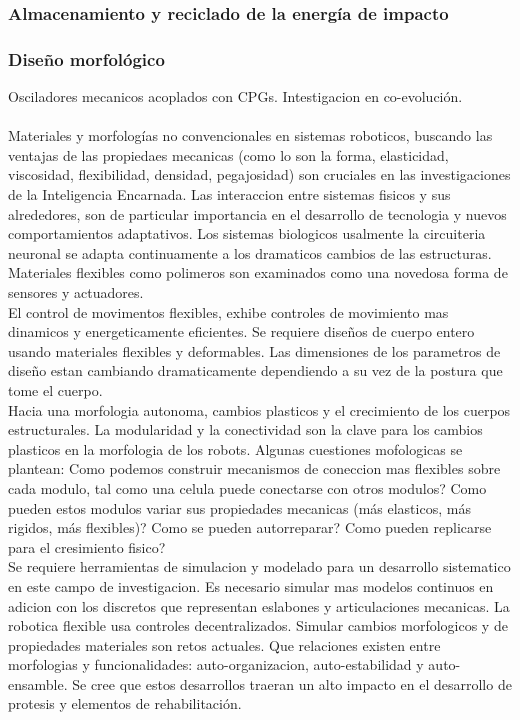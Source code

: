 \documentclass[10pt,onecolumn,twoside,letterpaper]{article}
\begin{document}
\subsubsection{Almacenamiento y reciclado de la energ\'ia de impacto}
\subsubsection{Dise\~no morfol\'ogico}
Osciladores mecanicos acoplados con CPGs. Intestigacion en co-evoluci\'on.\cite{Verdaasdonk2009}\\
\href{run:/home/jackmaster/Downloads/Doc Thesis/Walkers/[2009 B W Verdaasdonk and H F J M Koopman and F C T van der Helm] Art Energy efficient walking with central pattern generators: from passive dynamic walking to biologically inspired control.pdf}{
}\cite{Verdaasdonk2009}\\
Materiales y morfolog\'ias no convencionales en sistemas roboticos, buscando las ventajas de las propiedaes mecanicas (como lo son la forma, elasticidad, viscosidad, flexibilidad, densidad, pegajosidad) son cruciales en las investigaciones de la Inteligencia Encarnada. Las interaccion entre sistemas fisicos y sus alrededores, son de particular importancia en el desarrollo de tecnologia y nuevos comportamientos adaptativos. Los sistemas biologicos usalmente la circuiteria neuronal se adapta continuamente a los dramaticos cambios de las estructuras. Materiales flexibles como polimeros son examinados como una novedosa forma de sensores y actuadores.\cite{Iida2011}\\
El control de movimentos flexibles, exhibe controles de movimiento mas dinamicos y energeticamente eficientes. Se requiere dise\~nos de cuerpo entero usando materiales flexibles y deformables. Las dimensiones de los parametros de dise\~no estan cambiando dramaticamente dependiendo a su vez de la postura que tome el cuerpo.\\
Hacia una morfologia autonoma, cambios plasticos y el crecimiento de los cuerpos estructurales. La modularidad y la conectividad son la clave para los cambios plasticos en la morfologia de los robots. Algunas cuestiones mofologicas se plantean: Como podemos construir mecanismos de coneccion mas flexibles sobre cada modulo, tal como una celula puede conectarse con otros modulos? Como pueden estos modulos variar sus propiedades mecanicas (m\'as elasticos, m\'as rigidos, m\'as flexibles)? Como se pueden autorreparar? Como pueden replicarse para el cresimiento fisico?\cite{Iida2011}\\
Se requiere herramientas de simulacion y modelado para un desarrollo sistematico en este campo de investigacion. Es necesario simular mas modelos continuos en adicion con los discretos que representan eslabones y articulaciones mecanicas. La robotica flexible usa controles decentralizados. Simular cambios morfologicos y de propiedades materiales son retos actuales. Que relaciones existen entre morfologias y funcionalidades: auto-organizacion, auto-estabilidad y auto-ensamble. Se cree que estos desarrollos traeran un alto impacto en el desarrollo de protesis y elementos de rehabilitaci\'on.\cite{Iida2011}\\
\end{document}
